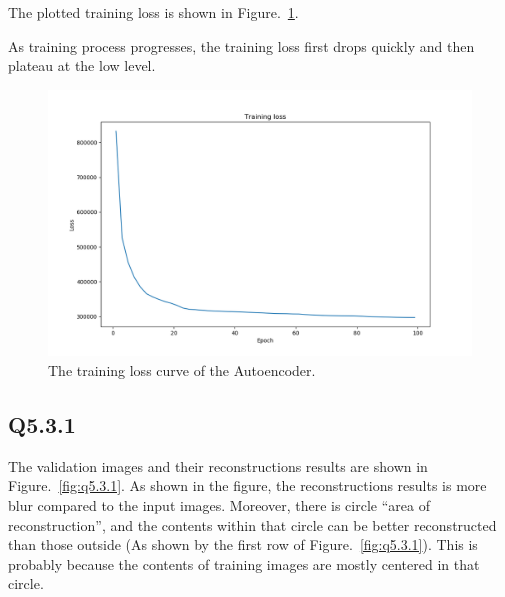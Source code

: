 \documentclass[11pt]{article}
\begin{document}
The plotted training loss is shown in Figure.~\ref{fig:q5.2}.

As training process progresses, the training loss first drops quickly and then plateau at the low level.

\begin{figure}[h!]
    \centering
    \includegraphics[width=.8\linewidth]{../results/q5_2.png}
    \caption{The training loss curve of the Autoencoder. }
    \label{fig:q5.2}
\end{figure}

\newpage

\subsection*{Q5.3.1}

The validation images and their reconstructions results are shown in Figure.~\ref{fig:q5.3.1}. As shown in the figure, the reconstructions results is more blur compared to the input images. Moreover, there is circle ``area of reconstruction'', and the contents within that circle can be better reconstructed than those outside (As shown by the first row of Figure.~\ref{fig:q5.3.1}). This is probably because the contents of training images are mostly centered in that circle.
\end{document}
